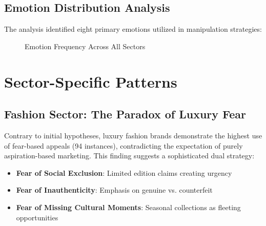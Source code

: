 \subsection{Emotion Distribution Analysis}

The analysis identified eight primary emotions utilized in manipulation strategies:

\begin{figure}[h!]
\centering
{}
\caption{Emotion Frequency Across All Sectors}
\label{fig:emotion_distribution}
\end{figure}

\section{Sector-Specific Patterns}

\subsection{Fashion Sector: The Paradox of Luxury Fear}

Contrary to initial hypotheses, luxury fashion brands demonstrate the highest use of fear-based appeals (94 instances), contradicting the expectation of purely aspiration-based marketing. This finding suggests a sophisticated dual strategy:

\begin{itemize}
    \item \textbf{Fear of Social Exclusion}: Limited edition claims creating urgency
    \item \textbf{Fear of Inauthenticity}: Emphasis on genuine vs. counterfeit
    \item \textbf{Fear of Missing Cultural Moments}: Seasonal collections as fleeting opportunities
\end{itemize}

